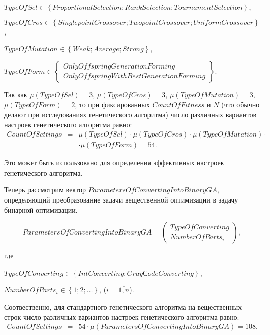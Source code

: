 $ TypeOfSel \in \left\lbrace ProportionalSelection; RankSelection; TournamentSelection\right\rbrace  $,

$ TypeOfCros \in \left\lbrace SinglepointCrossover; TwopointCrossover; UniformCrossover\right\rbrace  $,

$ TypeOfMutation \in \left\lbrace Weak; Average; Strong\right\rbrace  $,

$ TypeOfForm \in \left\lbrace \begin{array}{c} OnlyOffspringGenerationForming \\  OnlyOffspringWithBestGenerationForming
\end{array}\right\rbrace  $.

Так как $ \mu\left( TypeOfSel\right) =3 $, $ \mu\left( TypeOfCros\right)=3 $, $ \mu\left( TypeOfMutation\right)=3 $, $ \mu\left( TypeOfForm\right)=2 $, то при фиксированных $ CountOfFitness $ и $ N $ (что обычно делают при исследованиях генетического алгоритма) число различных вариантов настроек генетического алгоритма равно:
\begin{eqnarray}
\label{StandardGA:eq:CountOfSettings}
CountOfSettings&=& \mu\left( TypeOfSel\right)\cdot \mu\left( TypeOfCros\right) \cdot\mu\left( TypeOfMutation\right)\cdot\\ & & \cdot\mu\left( TypeOfForm\right)=54.\nonumber
\end{eqnarray}

Это может быть использовано для определения эффективных настроек генетического алгоритма.

Теперь рассмотрим вектор $ ParametersOfConvertingIntoBinaryGA $, определяющий преобразование задачи вещественной оптимизации в задачу бинарной оптимизации.

\begin{equation}
\label{StandardGA:eq:ParametersOfConvertingIntoBinaryGA2}
ParametersOfConvertingIntoBinaryGA=  \left( \begin{array}{c} TypeOfConverting  \\ NumberOfParts_i \end{array}\right),
\end{equation}

где

$TypeOfConverting \in \left\lbrace IntConverting; GrayСodeConverting\right\rbrace $,

$NumberOfParts_i \in \left\lbrace 1;2;\ldots\right\rbrace $, ($i=\overline{1,n}$).

Соотвественно, для стандартного генетического алгоритма на вещественных строк число различных вариантов настроек генетического алгоритма равно:
\begin{eqnarray}
\label{StandardGA:eq:CountOfSettingsReal}
CountOfSettings&=& 54\cdot \mu\left( ParametersOfConvertingIntoBinaryGA\right)=108.
\end{eqnarray}

